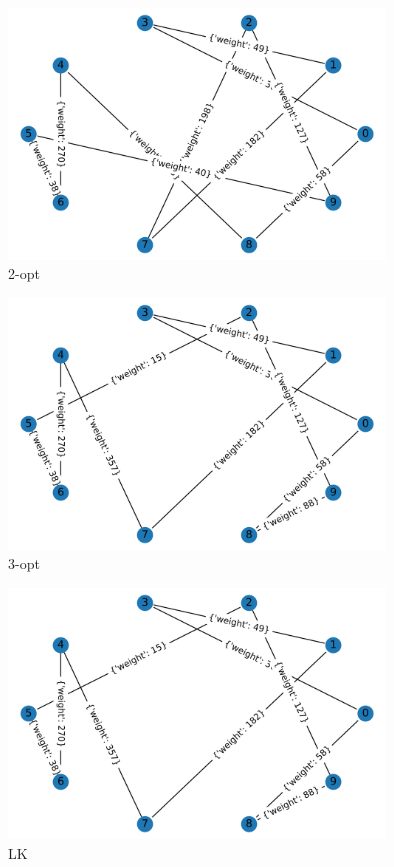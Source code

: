 \documentclass[8pt]{beamer}
\begin{document}
\begin{frame}
\begin{figure}
  \includegraphics[width=10cm]{primeri/primer2_2opt.png}
\caption{2-opt}
\label{Slika 6}
\end{figure}
\end{frame}


\begin{frame}
  \begin{figure}
  \includegraphics[width=10cm]{primeri/primer2_3opt.png}
 	\caption{3-opt}
	\label{Slika 7}
	\end{figure}
\end{frame}

\begin{frame}
\begin{figure}
  \includegraphics[width=10cm]{primeri/primer2_lk.png}
\caption{LK}
\label{Slika 8}
\end{figure}
\end{frame}
\end{document}
